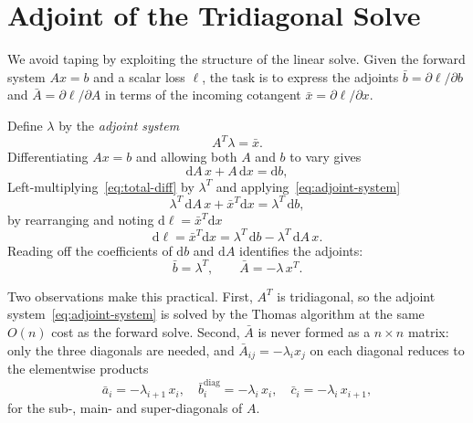\section{Adjoint of the Tridiagonal Solve}\label{sec:adjoint-solve}

We avoid taping by exploiting the structure of the linear solve. Given
the forward system $Ax = b$ and a scalar loss $\ell$, the task is to
express the adjoints $\bar{b} = \partial \ell / \partial b$ and
$\bar{A} = \partial \ell / \partial A$ in terms of the incoming
cotangent $\bar{x} = \partial \ell / \partial x$.

Define $\lambda$ by the \emph{adjoint system}
\begin{equation}
  A^T \lambda = \bar{x}.
  \label{eq:adjoint-system}
\end{equation}
Differentiating $Ax = b$ and allowing both $A$ and $b$ to vary gives
\begin{equation}
  \mathrm{d}A\, x + A\, \mathrm{d}x = \mathrm{d}b,
  \label{eq:total-diff}
\end{equation}
Left-multiplying~\cref{eq:total-diff} by $\lambda^T$ and
applying~\cref{eq:adjoint-system}
\begin{equation}
  \lambda^T\, \mathrm{d}A\, x + \bar{x}^T \mathrm{d}x
  = \lambda^T\, \mathrm{d}b,
\end{equation}
by rearranging and noting $\mathrm{d}\ell = \bar{x}^T \mathrm{d}x$
\begin{equation}
  \mathrm{d}\ell
  = \bar{x}^T \mathrm{d}x
  = \lambda^T\, \mathrm{d}b - \lambda^T\, \mathrm{d}A\, x.
  \label{eq:dloss}
\end{equation}
Reading off the coefficients of $\mathrm{d}b$ and $\mathrm{d}A$ identifies the
adjoints:
\begin{equation}
  \bar{b} = \lambda^T,
  \qquad
  \bar{A} = -\lambda\, x^T.
  \label{eq:adjoints}
\end{equation}

Two observations make this practical. First, $A^T$ is tridiagonal, so
the adjoint system~\cref{eq:adjoint-system} is solved by the Thomas
algorithm at the same $O(n)$ cost as the forward solve. Second,
$\bar{A}$ is never formed as a $n \times n$ matrix: only the
three diagonals are needed, and
$\bar{A}_{ij} = -\lambda_i x_j$ on each diagonal reduces to the
elementwise products
\begin{equation}
  \bar{a}_i = -\lambda_{i+1}\, x_i, \quad
  \bar{b}_i^{\text{diag}} = -\lambda_i\, x_i, \quad
  \bar{c}_i = -\lambda_i\, x_{i+1},
  \label{eq:diag-adjoints}
\end{equation}
for the sub-, main- and super-diagonals of $A$.


